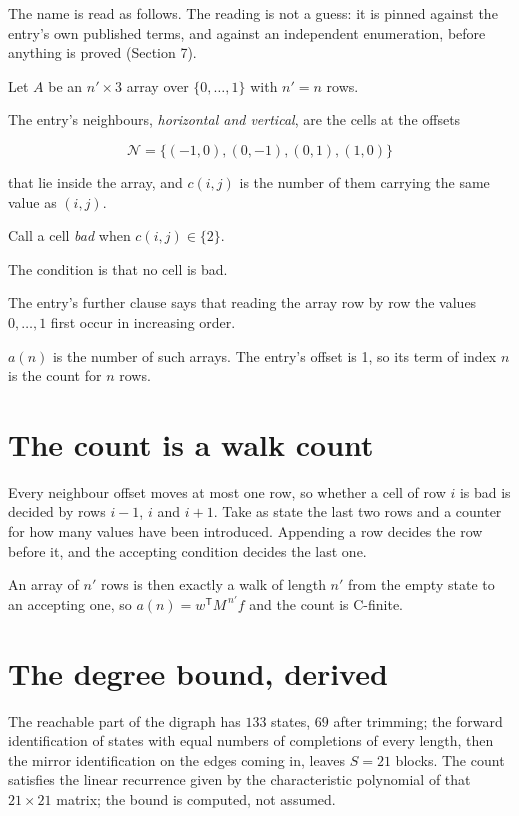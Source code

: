 \documentclass[11pt]{article}
\theoremstyle{definition}
\begin{document}
The name is read as follows. The reading is not a guess: it is pinned against the entry's own published terms, and against an independent enumeration, before anything is proved (Section 7).

Let $A$ be an $n' \times 3$ array over $\{0,\dots,1\}$ with $n' = n$ rows.

The entry's neighbours, {\itshape horizontal and vertical}, are the cells at the offsets

\[\mathcal{N} = \{(-1,0), (0,-1), (0,1), (1,0)\}\]

that lie inside the array, and $c(i,j)$ is the number of them carrying the same value as $(i,j)$.

Call a cell {\itshape bad} when $c(i,j) \in \{2\}$.

The condition is that no cell is bad.

The entry's further clause says that reading the array row by row the values $0,\dots,1$ first occur in increasing order.

$a(n)$ is the number of such arrays. The entry's offset is 1, so its term of index $n$ is the count for $n$ rows.

\section{The count is a walk count}

Every neighbour offset moves at most one row, so whether a cell of row $i$ is bad is decided by rows $i-1$, $i$ and $i+1$. Take as state the last two rows and a counter for how many values have been introduced. Appending a row decides the row before it, and the accepting condition decides the last one.

An array of $n'$ rows is then exactly a walk of length $n'$ from the empty state to an accepting one, so $a(n) = w^{\mathsf T}M^{\,n'}f$ and the count is C-finite.

\section{The degree bound, derived}

The reachable part of the digraph has $133$ states, $69$ after trimming; the forward identification of states with equal numbers of completions of every length, then the mirror identification on the edges coming in, leaves $S = 21$ blocks. The count satisfies the linear recurrence given by the characteristic polynomial of that $21\times21$ matrix; the bound is computed, not assumed.
\end{document}
